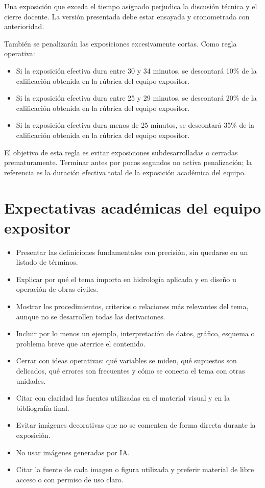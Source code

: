 \documentclass[11pt]{article}
\begin{document}
\begin{warnbox}
Una exposición que exceda el tiempo asignado perjudica la discusión técnica y el cierre docente. La versión presentada debe estar ensayada y cronometrada con anterioridad.
\end{warnbox}

\begin{warnbox}
También se penalizarán las exposiciones excesivamente cortas. Como regla operativa:
\begin{itemize}
\item Si la exposición efectiva dura entre 30 y 34 minutos, se descontará 10\% de la calificación obtenida en la rúbrica del equipo expositor.
\item Si la exposición efectiva dura entre 25 y 29 minutos, se descontará 20\% de la calificación obtenida en la rúbrica del equipo expositor.
\item Si la exposición efectiva dura menos de 25 minutos, se descontará 35\% de la calificación obtenida en la rúbrica del equipo expositor.
\end{itemize}
El objetivo de esta regla es evitar exposiciones subdesarrolladas o cerradas prematuramente. Terminar antes por pocos segundos no activa penalización; la referencia es la duración efectiva total de la exposición académica del equipo.
\end{warnbox}

\section{Expectativas académicas del equipo expositor}
\begin{itemize}
\item Presentar las definiciones fundamentales con precisión, sin quedarse en un listado de términos.
\item Explicar por qué el tema importa en hidrología aplicada y en diseño u operación de obras civiles.
\item Mostrar los procedimientos, criterios o relaciones más relevantes del tema, aunque no se desarrollen todas las derivaciones.
\item Incluir por lo menos un ejemplo, interpretación de datos, gráfico, esquema o problema breve que aterrice el contenido.
\item Cerrar con ideas operativas: qué variables se miden, qué supuestos son delicados, qué errores son frecuentes y cómo se conecta el tema con otras unidades.
\item Citar con claridad las fuentes utilizadas en el material visual y en la bibliografía final.
\item Evitar imágenes decorativas que no se comenten de forma directa durante la exposición.
\item No usar imágenes generadas por IA.
\item Citar la fuente de cada imagen o figura utilizada y preferir material de libre acceso o con permiso de uso claro.
\end{itemize}
\end{document}
